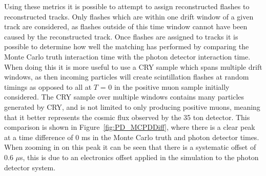 Using these metrics it is possible to attempt to assign reconstructed flashes to reconstructed tracks. Only flashes which are within one drift window of a given track are considered, as flashes outside of this time window cannot have been caused by the reconstructed track. Once flashes are assigned to tracks it is possible to determine how well the matching has performed by comparing the Monte Carlo truth interaction time with the photon detector interaction time. When doing this it is more useful to use a CRY sample which spans multiple drift windows, as then incoming particles will create scintillation flashes at random timings as opposed to all at $T$ = 0 in the positive muon sample initially considered. The CRY sample over multiple windows contains many particles generated by CRY, and is not limited to only producing positive muons, meaning that it better represents the cosmic flux observed by the 35 ton detector. This comparison is shown in Figure~\ref{fig:PD_MCPDDiff}, where there is a clear peak at a time difference of 0 ms in the Monte Carlo truth and photon detector times. When zooming in on this peak it can be seen that there is a systematic offset of 0.6 $\mu$s, this is due to an electronics offset applied in the simulation to the photon detector system. \\

